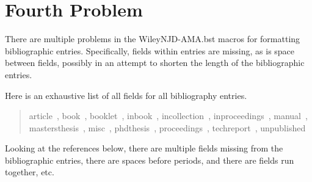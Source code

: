 \documentclass[AMA,STIX1COL]{WileyNJD-v2}
\begin{document}
\section{Fourth Problem}

There are multiple problems in the WileyNJD-AMA.bst macros for formatting bibliographic entries.
Specifically, fields within entries are missing, as is space between fields, possibly in an attempt to shorten the length of the bibliographic entries.

Here is an exhaustive list of all fields for all bibliography entries.
\begin{quote}
article~\cite{article01}, book~\cite{book01}, booklet~\cite{booklet01}, inbook~\cite{inbook01}, incollection~\cite{incollection01}, inproceedings~\cite{inproceedings01}, manual~\cite{manual01}, mastersthesis~\cite{mastersthesis01}, misc~\cite{misc01}, phdthesis~\cite{phdthesis01}, proceedings~\cite{proceedings01}, techreport~\cite{techreport01}, unpublished~\cite{unpublished01}
\end{quote}
Looking at the references below, there are multiple fields missing from the bibliographic entries, there are spaces before periods, and there are fields run together, etc.

\nocite{*}%
%
\end{document}
